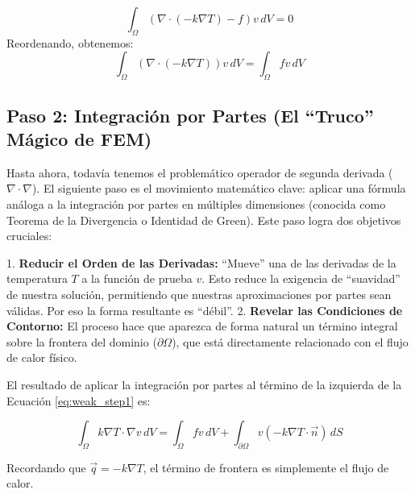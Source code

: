 \documentclass[11pt, a4paper]{article}
\begin{document}
\begin{equation}
    \int_{\Omega} \left( \nabla \cdot (-k \nabla T) - f \right) v \, dV = 0
\end{equation}
Reordenando, obtenemos:
\begin{equation}
    \int_{\Omega} \left( \nabla \cdot (-k \nabla T) \right) v \, dV = \int_{\Omega} f v \, dV
    \label{eq:weak_step1}
\end{equation}

\subsection{Paso 2: Integración por Partes (El ``Truco'' Mágico de FEM)}
Hasta ahora, todavía tenemos el problemático operador de segunda derivada ($\nabla \cdot \nabla$). El siguiente paso es el movimiento matemático clave: aplicar una fórmula análoga a la integración por partes en múltiples dimensiones (conocida como Teorema de la Divergencia o Identidad de Green). Este paso logra dos objetivos cruciales:

1.  \textbf{Reducir el Orden de las Derivadas:} ``Mueve'' una de las derivadas de la temperatura $T$ a la función de prueba $v$. Esto reduce la exigencia de ``suavidad'' de nuestra solución, permitiendo que nuestras aproximaciones por partes sean válidas. Por eso la forma resultante es ``débil''.
2.  \textbf{Revelar las Condiciones de Contorno:} El proceso hace que aparezca de forma natural un término integral sobre la frontera del dominio ($\partial \Omega$), que está directamente relacionado con el flujo de calor físico.

El resultado de aplicar la integración por partes al término de la izquierda de la Ecuación \ref{eq:weak_step1} es:

\begin{equation}
    \int_{\Omega} k \nabla T \cdot \nabla v \, dV = \int_{\Omega} f v \, dV + \int_{\partial \Omega} v (-k \nabla T \cdot \vec{n}) \, dS
\end{equation}

Recordando que $\vec{q} = -k \nabla T$, el término de frontera es simplemente el flujo de calor.
\end{document}
